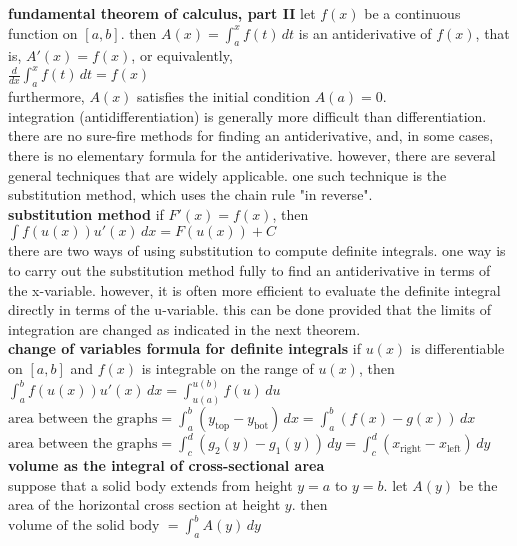 \documentclass{article}
\begin{document}
\textbf{fundamental theorem of calculus, part II} let $f(x)$ be a continuous function on $[a, b]$. then $A(x) = \int_{a}^{x}f(t)\, dt$ is an antiderivative of $f(x)$, that is, $A'(x) = f(x)$, or equivalently,\\
$\frac{d}{dx}\int_{a}^{x}f(t)\,dt = f(x)$\\
furthermore, $A(x)$ satisfies the initial condition $A(a) = 0$.\\

integration (antidifferentiation) is generally more difficult than differentiation. there are no sure-fire methods for finding an antiderivative, and, in some cases, there is no elementary formula for the antiderivative. however, there are several general techniques that are widely applicable. one such technique is the substitution method, which uses the chain rule "in reverse".\\

\textbf{substitution method} if $F'(x) = f(x)$, then\\
$\int f(u(x))u'(x)\,dx = F(u(x)) + C$\\

there are two ways of using substitution to compute definite integrals. one way is to carry out the substitution method fully to find an antiderivative in terms of the x-variable. however, it is often more efficient to evaluate the definite integral directly in terms of the u-variable. this can be done provided that the limits of integration are changed as indicated in the next theorem.\\

\textbf{change of variables formula for definite integrals} if $u(x)$ is differentiable on $[a, b]$ and $f(x)$ is integrable on the range of $u(x)$, then\\
$\int_{a}^{b}f(u(x))u'(x)\,dx = \int_{u(a)}^{u(b)}f(u)\,du$\\

$\text{area between the graphs} = \int_{a}^{b}(y_{\text{top}} - y_{\text{bot}})\,dx = \int_{a}^{b}(f(x) - g(x))\,dx$\\

$\text{area between the graphs} = \int_{c}^{d}(g_2(y) - g_1(y))\,dy = \int_{c}^{d}(x_{\text{right}} - x_{\text{left}})\,dy$\\

\textbf{volume as the integral of cross-sectional area}\\
suppose that a solid body extends from height $y = a$ to $y = b$. let $A(y)$ be the area of the horizontal cross section at height $y$. then\\ $\text{volume of the solid body } = \int_{a}^{b}A(y)\,dy$\\
\end{document}
